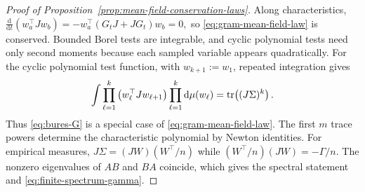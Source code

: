 \begin{proof}[Proof of Proposition~\ref{prop:mean-field-conservation-laws}]
Along characteristics,
\(
\frac{\mathrm{d}}{\mathrm{d}t}(w_a^\top Jw_b)
=-w_a^\top(G_tJ+JG_t)w_b=0,
\)
so \eqref{eq:gram-mean-field-law} is conserved.
Bounded Borel tests are integrable, and cyclic polynomial tests need
only second moments because each sampled variable appears quadratically.
For the cyclic polynomial test function, with \(w_{k+1}:=w_1\), repeated
integration gives
\[
\int\prod_{\ell=1}^k
\left(w_\ell^\top Jw_{\ell+1}\right)
\prod_{\ell=1}^k\mathrm{d}\mu(w_\ell)
=\operatorname{tr}\!\left((J\Sigma)^k\right).
\]
Thus \eqref{eq:bures-G} is a special case of
\eqref{eq:gram-mean-field-law}.
The first \(m\) trace powers determine the characteristic polynomial by Newton identities.
For empirical measures, $J\Sigma=(JW)(W^\top/n)$ while $(W^\top/n)(JW)=-\Gamma/n$.
The nonzero eigenvalues of $AB$ and $BA$ coincide, which gives the spectral statement and \eqref{eq:finite-spectrum-gamma}.
\end{proof}


